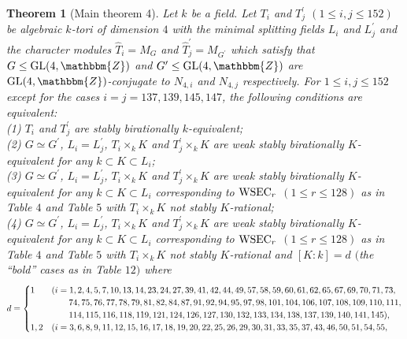 \documentclass{amsart}
\theoremstyle{plain}
\newtheorem{theorem}{Theorem}[section]
\theoremstyle{definition}
\theoremstyle{remark}
\newcommand{\bZ}{\mathbbm{Z}}\newcommand{\bQ}{\mathbbm{Q}}
\newcommand{\GL}{{\rm GL}}\newcommand{\SL}{{\rm SL}}
\newcounter{sub}\def\tr{\mbox{tr }}
\begin{document}

%
\begin{theorem}[Main theorem 4]\label{thmain4}
Let $k$ be a field.  
Let $T_i$ and $T_j^\prime$ $(1\leq i,j\leq 152)$ 
be algebraic $k$-tori of dimension $4$ 
with the minimal splitting fields $L_i$ and $L^\prime_j$ 
and the character modules 
$\widehat{T}_i=M_G$ and $\widehat{T}^\prime_j=M_{G^\prime}$ 
which satisfy that 
$G\leq \GL(4,\bZ)$ and $G^\prime\leq \GL(4,\bZ)$ are 
$\GL(4,\bZ)$-conjugate to $N_{4,i}$ and $N_{4,j}$ respectively. 
For $1\leq i,j\leq 152$ 
except for the cases $i=j=137,139,145,147$, 
the following conditions are equivalent:\\
{\rm (1)} $T_i$ and $T_j^\prime$ are stably birationally $k$-equivalent;\\
{\rm (2)} 
$G\simeq G^\prime$, 
$L_i=L_j^\prime$, 
$T_i\times_k K$ and $T_j^\prime\times_k K$ 
are weak stably birationally $K$-equivalent 
for any $k\subset K\subset L_i$;\\
{\rm (3)} 
$G\simeq G^\prime$, 
$L_i=L_j^\prime$, 
$T_i\times_k K$ and $T_j^\prime\times_k K$ 
are weak stably birationally $K$-equivalent 
for any $k\subset K\subset L_i$ corresponding to 
${\rm WSEC}_r$ $(1\leq r\leq 128)$ as in Table $4$ and Table $5$ 
with $T_i\times_k K$ not stably $K$-rational;\\
{\rm (4)} 
$G\simeq G^\prime$, 
$L_i=L_j^\prime$, 
$T_i\times_k K$ and $T_j^\prime\times_k K$ 
are weak stably birationally $K$-equivalent 
for any $k\subset K\subset L_i$ corresponding to 
${\rm WSEC}_r$ $(1\leq r\leq 128)$ as in Table $4$ and Table $5$ 
with $T_i\times_k K$ not stably $K$-rational 
and $[K:k]=d$ 
$($the ``bold'' cases as in {\rm Table} $12$$)$ 
where 
\begin{align*}
d=
\begin{cases}
1&(i=1,2,4,5,7,10,13,14,23,24,27,39,41,42,44,49,57,58,59,60,61,62,65,67,69,70,71,73,\\
&\hspace*{7mm}74,75,76,77, 78,79,81,82,84,87,91,92,94,95,97,98,101,104,106,107,108,109,110,111,\\
&\hspace*{7mm}114,115,116,118,119,121,124,126,127,130,132,133,134,138
,137,139,
140,141,
145),\\
1,2&(i=3,6,8,9,11,12,15,16,17,18,19,20,22,25,26,29,30,31,33,35,37,43,46,50,51,54,55,\\

\end{cases}
\end{align*}$$
\end{theorem}
\end{document}
